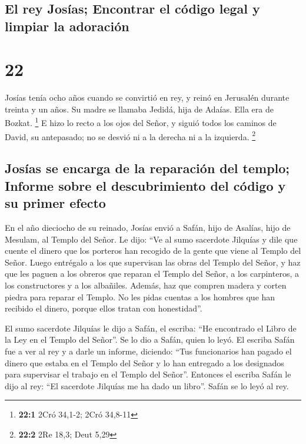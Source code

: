 \hypertarget{el-rey-josuxedas-encontrar-el-cuxf3digo-legal-y-limpiar-la-adoraciuxf3n}{%
\subsection{El rey Josías; Encontrar el código legal y limpiar la
adoración}\label{el-rey-josuxedas-encontrar-el-cuxf3digo-legal-y-limpiar-la-adoraciuxf3n}}

\hypertarget{section-21}{%
\section{22}\label{section-21}}

 Josías tenía ocho años cuando se convirtió en rey, y
reinó en Jerusalén durante treinta y un años. Su madre se llamaba
Jedidá, hija de Adaías. Ella era de Bozkat. \footnote{\textbf{22:1} 2Cró
  34,1-2; 2Cró 34,8-11}  E hizo lo recto a los ojos del
Señor, y siguió todos los caminos de David, su antepasado; no se desvió
ni a la derecha ni a la izquierda. \footnote{\textbf{22:2} 2Re 18,3;
  Deut 5,29}

\hypertarget{josuxedas-se-encarga-de-la-reparaciuxf3n-del-templo-informe-sobre-el-descubrimiento-del-cuxf3digo-y-su-primer-efecto}{%
\subsection{Josías se encarga de la reparación del templo; Informe sobre
el descubrimiento del código y su primer
efecto}\label{josuxedas-se-encarga-de-la-reparaciuxf3n-del-templo-informe-sobre-el-descubrimiento-del-cuxf3digo-y-su-primer-efecto}}

 En el año dieciocho de su reinado, Josías envió a Safán,
hijo de Asalías, hijo de Mesulam, al Templo del Señor. Le dijo:
 ``Ve al sumo sacerdote Jilquías y dile que cuente el
dinero que los porteros han recogido de la gente que viene al Templo del
Señor.  Luego entrégalo a los que supervisan las obras del
Templo del Señor, y haz que les paguen a los obreros que reparan el
Templo del Señor,  a los carpinteros, a los constructores
y a los albañiles. Además, haz que compren madera y corten piedra para
reparar el Templo.  No les pidas cuentas a los hombres que
han recibido el dinero, porque ellos tratan con honestidad''.

 El sumo sacerdote Jilquías le dijo a Safán, el escriba:
``He encontrado el Libro de la Ley en el Templo del Señor''. Se lo dio a
Safán, quien lo leyó.  El escriba Safán fue a ver al rey y
a darle un informe, diciendo: ``Tus funcionarios han pagado el dinero
que estaba en el Templo del Señor y lo han entregado a los designados
para supervisar el trabajo en el Templo del Señor''. 
Entonces el escriba Safán le dijo al rey: ``El sacerdote Jilquías me ha
dado un libro''. Safán se lo leyó al rey.

